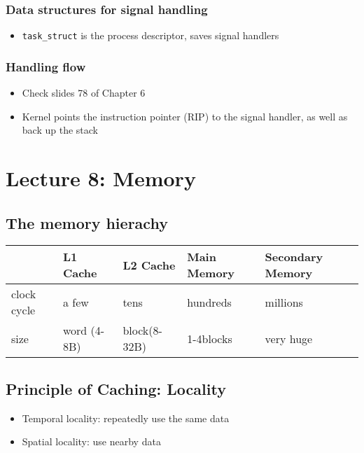 \documentclass[11pt]{article}
\begin{document}
\subsubsection{Data structures for signal handling}
\label{sec:orge49b6e2}
\begin{itemize}
\item \texttt{task\_struct} is the process descriptor, saves signal handlers
\end{itemize}
\subsubsection{Handling flow}
\label{sec:org2870c71}
\begin{itemize}
\item Check slides 78 of Chapter 6
\item Kernel points the instruction pointer (RIP) to the signal handler, as well as
back up the stack
\end{itemize}
\section{Lecture 8: Memory}
\label{sec:org36ff607}
\subsection{The memory hierachy}
\label{sec:org9c4482e}
\begin{center}
\begin{tabular}{lllll}
 & L1 Cache & L2 Cache & Main Memory & Secondary Memory\\
\hline
clock cycle & a few & tens & hundreds & millions\\
size & word (4-8B) & block(8-32B) & 1-4blocks & very huge\\
\end{tabular}
\end{center}
\subsection{Principle of Caching: Locality}
\label{sec:orgc3af8e3}
\begin{itemize}
\item Temporal locality: repeatedly use the same data
\item Spatial locality: use nearby data
\end{itemize}
\end{document}
